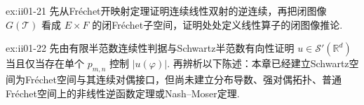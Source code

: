\begin{FAExercise}[连续逆与闭图像]{ex:ii01-21}
先从Fr\'echet开映射定理证明连续线性双射的逆连续，再把闭图像 \(\displaystyle G(\mathcal T)\) 看成 \(\displaystyle E\times F\) 的闭Fr\'echet子空间，证明处处定义线性算子的闭图像推论.
\end{FAExercise}

\begin{FAExercise}[Schwartz对偶与未来边界]{ex:ii01-22}
先由有限半范数连续性判据与Schwartz半范数有向性证明 \(\displaystyle u\in\mathcal S'(\mathbb R^d)\) 当且仅当存在单个 \(\displaystyle p_{m,n}\) 控制 \(\displaystyle |u(\varphi)|\). 再辨析以下陈述：本章已经建立Schwartz空间为Fr\'echet空间与其连续对偶接口，但尚未建立分布导数、强对偶拓扑、普通Fr\'echet空间上的非线性逆函数定理或Nash--Moser定理.
\end{FAExercise}
